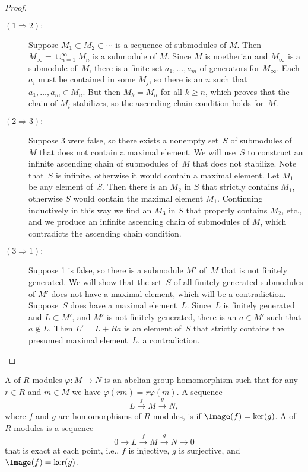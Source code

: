 \begin{proof}
  \hfill
  \begin{description}
    \item[$(1 \Rightarrow 2):$]
      Suppose $M_1\subset M_2\subset \cdots$ is a
      sequence of submodules of $M$.  Then
      $M_\infty=\cup_{n=1}^{\infty} M_n$ is a submodule of $M$.
      Since $M$ is noetherian and $M_\infty$ is a submodule of~$M$,
      there is a finite set $a_1,\dots, a_m$ of
      generators for $M_{\infty}$.  Each $a_i$
      must be contained in some $M_j$, so there is an $n$ such that
      $a_1,\dots, a_m\in M_n$.  But then $M_{k}=M_n$ for all
      $k\geq n$, which proves that the chain of $M_i$ stabilizes,
      so the ascending chain condition holds for~$M$.

    \item[$(2 \Rightarrow 3):$]
      Suppose 3 were false, so there exists
      a nonempty set~$S$ of submodules of~$M$ that does not
      contain a maximal element.  We will use~$S$ to construct
      an infinite ascending chain of submodules of~$M$ that
      does not stabilize. Note that~$S$ is infinite, otherwise
      it would contain a maximal element.  Let $M_1$ be
      any element of~$S$.  Then there is an $M_2$ in $S$ that
      strictly contains $M_1$, otherwise $S$ would contain the maximal
      element $M_1$. Continuing inductively in this way we find
      an $M_3$ in $S$ that properly contains $M_2$, etc., and we
      produce an infinite ascending chain of submodules of $M$,
      which contradicts the ascending chain condition.

    \item[$(3 \Rightarrow 1):$]
      Suppose 1 is false, so there is a submodule $M'$ of~$M$ that
      is not finitely generated.  We will show that the set~$S$ of
      all finitely generated submodules of $M'$ does not
      have a maximal element, which will be a contradiction.
      Suppose~$S$ does have a maximal element~$L$.  Since~$L$
      is finitely generated and $L\subset M'$, and $M'$ is not
      finitely generated, there is an $a\in M'$ such that
      $a\not\in L$.  Then $L'=L+Ra$ is an element of~$S$ that
      strictly contains the presumed maximal element~$L$,
      a contradiction.
  \end{description}
\end{proof}

\begin{definition}
  A  of $R$-modules $\varphi:M\to N$ is an abelian
  group homomorphism such that for any $r\in R$ and $m\in M$ we have
  $\varphi(rm) = r\varphi(m)$. A sequence
  $$
    L \xrightarrow{f} M \xrightarrow{g} N,
  $$
  where $f$ and $g$ are homomorphisms of $R$-modules, is 
  if $\Image(f)=\ker(g)$. A  of $R$-modules
  is a sequence
  $$
    0 \to L \xrightarrow{f} M \xrightarrow{g} N \to 0
  $$
  that is exact at each point, i.e., $f$ is injective, $g$ is surjective,
  and $\Image(f) = \ker(g)$.
\end{definition}

